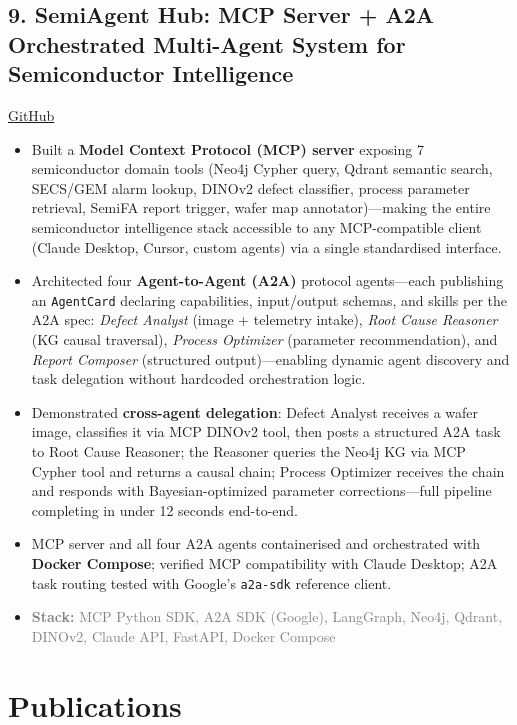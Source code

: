 \documentclass[11pt,a4paper]{article}
\newcommand{\projectstack}[1]{\textcolor{graytext}{\textbf{Stack:} #1}}
\begin{document}
\subsection{9. SemiAgent Hub: MCP Server + A2A Orchestrated Multi-Agent System for Semiconductor Intelligence}
{\small \href{https://github.com/Shivamckaushik/SemiAgent-Hub}{GitHub}}
\begin{itemize}[leftmargin=*, nosep, topsep=3pt]
    \item Built a \textbf{Model Context Protocol (MCP) server} exposing 7 semiconductor domain tools (Neo4j Cypher query, Qdrant semantic search, SECS/GEM alarm lookup, DINOv2 defect classifier, process parameter retrieval, SemiFA report trigger, wafer map annotator)---making the entire semiconductor intelligence stack accessible to any MCP-compatible client (Claude Desktop, Cursor, custom agents) via a single standardised interface.
    \item Architected four \textbf{Agent-to-Agent (A2A)} protocol agents---each publishing an \texttt{AgentCard} declaring capabilities, input/output schemas, and skills per the A2A spec: \textit{Defect Analyst} (image + telemetry intake), \textit{Root Cause Reasoner} (KG causal traversal), \textit{Process Optimizer} (parameter recommendation), and \textit{Report Composer} (structured output)---enabling dynamic agent discovery and task delegation without hardcoded orchestration logic.
    \item Demonstrated \textbf{cross-agent delegation}: Defect Analyst receives a wafer image, classifies it via MCP DINOv2 tool, then posts a structured A2A task to Root Cause Reasoner; the Reasoner queries the Neo4j KG via MCP Cypher tool and returns a causal chain; Process Optimizer receives the chain and responds with Bayesian-optimized parameter corrections---full pipeline completing in under 12 seconds end-to-end.
    \item MCP server and all four A2A agents containerised and orchestrated with \textbf{Docker Compose}; verified MCP compatibility with Claude Desktop; A2A task routing tested with Google's \texttt{a2a-sdk} reference client.
    \item \projectstack{MCP Python SDK, A2A SDK (Google), LangGraph, Neo4j, Qdrant, DINOv2, Claude API, FastAPI, Docker Compose}
\end{itemize}

\section{Publications}
\end{document}
